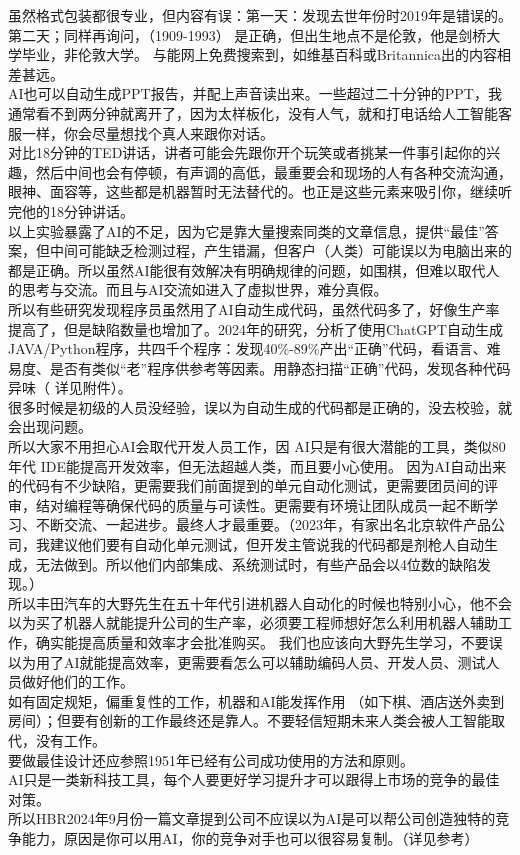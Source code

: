 虽然格式包装都很专业，但内容有误：第一天：发现去世年份时2019年是错误的。第二天；同样再询问，（1909-1993）
是正确，但出生地点不是伦敦，他是剑桥大学毕业，非伦敦大学。
与能网上免费搜索到，如维基百科或Britannica出的内容相差甚远。\\
AI也可以自动生成PPT报告，并配上声音读出来。一些超过二十分钟的PPT，我通常看不到两分钟就离开了，因为太样板化，没有人气，就和打电话给人工智能客服一样，你会尽量想找个真人来跟你对话。\\
对比18分钟的TED讲话，讲者可能会先跟你开个玩笑或者挑某一件事引起你的兴趣，然后中间也会有停顿，有声调的高低，最重要会和现场的人有各种交流沟通，眼神、面容等，这些都是机器暂时无法替代的。也正是这些元素来吸引你，继续听完他的18分钟讲话。\\
以上实验暴露了AI的不足，因为它是靠大量搜索同类的文章信息，提供``最佳''答案，但中间可能缺乏检测过程，产生错漏，但客户（人类）可能误以为电脑出来的都是正确。所以虽然AI能很有效解决有明确规律的问题，如围棋，但难以取代人的思考与交流。而且与AI交流如进入了虚拟世界，难分真假。\\
所以有些研究发现程序员虽然用了AI自动生成代码，虽然代码多了，好像生产率提高了，但是缺陷数量也增加了。2024年的研究，分析了使用ChatGPT自动生成JAVA/Python程序，共四千个程序：发现40\%-89\%产出``正确''代码，看语言、难易度、是否有类似``老''程序供参考等因素。用静态扫描``正确''代码，发现各种代码异味（
详见附件）。\\
很多时候是初级的人员没经验，误以为自动生成的代码都是正确的，没去校验，就会出现问题。\\
所以大家不用担心AI会取代开发人员工作，因
AI只是有很大潜能的工具，类似80年代
IDE能提高开发效率，但无法超越人类，而且要小心使用。
因为AI自动出来的代码有不少缺陷，更需要我们前面提到的单元自动化测试，更需要团员间的评审，结对编程等确保代码的质量与可读性。更需要有环境让团队成员一起不断学习、不断交流、一起进步。最终人才最重要。（2023年，有家出名北京软件产品公司，我建议他们要有自动化单元测试，但开发主管说我的代码都是剂枪人自动生成，无法做到。所以他们内部集成、系统测试时，有些产品会以4位数的缺陷发现。）\\
所以丰田汽车的大野先生在五十年代引进机器人自动化的时候也特别小心，他不会以为买了机器人就能提升公司的生产率，必须要工程师想好怎么利用机器人辅助工作，确实能提高质量和效率才会批准购买。
我们也应该向大野先生学习，不要误以为用了AI就能提高效率，更需要看怎么可以辅助编码人员、开发人员、测试人员做好他们的工作。\\
如有固定规矩，偏重复性的工作，机器和AI能发挥作用
（如下棋、酒店送外卖到房间）；但要有创新的工作最终还是靠人。不要轻信短期未来人类会被人工智能取代，没有工作。\\
要做最佳设计还应参照1951年已经有公司成功使用的方法和原则。\\
AI只是一类新科技工具，每个人要更好学习提升才可以跟得上市场的竞争的最佳对策。\\
所以HBR2024年9月份一篇文章提到公司不应误以为AI是可以帮公司创造独特的竞争能力，原因是你可以用AI，你的竞争对手也可以很容易复制。（详见参考）

